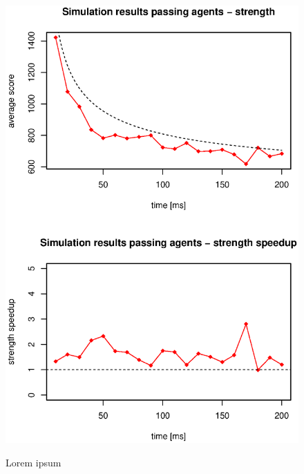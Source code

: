 \begin{figure}
\begin{center}
\includegraphics{img/simulation-passing-strength.eps}
\end{center}
\caption{\footnotesize Lorem ipsum}{\footnotesize }
\label{fig_simulation_passing_strength}
\end{figure}

